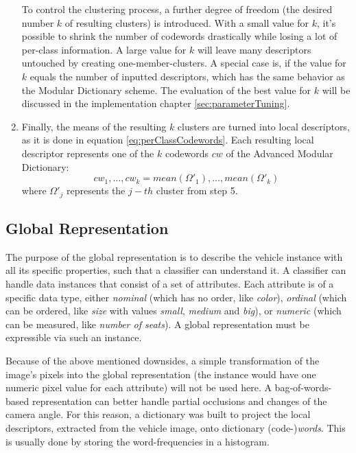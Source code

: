 \begin{enumerate}
To control the clustering process, a further degree of freedom (the desired number $k$ of resulting clusters) is introduced. With a small value for $k$, it's possible to shrink the number of codewords drastically while losing a lot of per-class information. A large value for $k$ will leave many descriptors untouched by creating one-member-clusters. A special case is, if the value for $k$ equals the number of inputted descriptors, which has the same behavior as the Modular Dictionary scheme. The evaluation of the best value for $k$ will be discussed in the implementation chapter \ref{sec:parameterTuning}.
	\item Finally, the means of the resulting $k$ clusters are turned into local descriptors, as it is done in equation \ref{eq:perClassCodewords}. Each resulting local descriptor represents one of the $k$ codewords $cw$ of the Advanced Modular Dictionary:
	\begin{equation}\label{eq:finalCodewords}
	{cw}_1,\dots,{cw}_k = mean({\Omega'}_1),\dots,mean({\Omega'}_k)
	\end{equation}
where ${\Omega'}_j$ represents the $j-th$ cluster from step 5.
\end{enumerate}

\subsection{Global Representation}\label{sec:globalRepresentationConcept}
The purpose of the global representation is to describe the vehicle instance with all its specific properties, such that a classifier can understand it. A classifier can handle data instances that consist of a set of attributes. Each attribute is of a specific data type, either \emph{nominal} (which has no order, like \emph{color}), \emph{ordinal} (which can be ordered, like \emph{size} with values \emph{small}, \emph{medium} and \emph{big}), or \emph{numeric} (which can be measured, like \emph{number of seats}). A global representation must be expressible via such an instance.

Because of the above mentioned downsides, a simple transformation of the image's pixels into the global representation (the instance would have one numeric pixel value for each attribute) will not be used here. A bag-of-words-based representation can better handle partial occlusions and changes of the camera angle. For this reason, a dictionary was built to project the local descriptors, extracted from the vehicle image, onto dictionary (code-)\emph{words}. This is usually done by storing the word-frequencies in a histogram.

